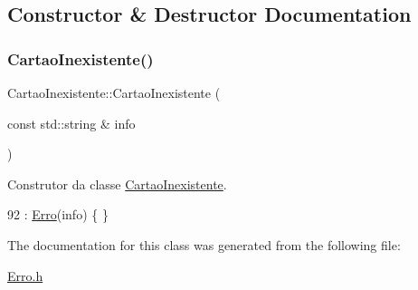 \subsection{Constructor \& Destructor Documentation}
\mbox{\label{classCartaoInexistente_a48a83d627aabc141aa1bb7216c74918b}} 
\subsubsection{\texorpdfstring{Cartao\+Inexistente()}{CartaoInexistente()}}
{\footnotesize\ttfamily Cartao\+Inexistente\+::\+Cartao\+Inexistente (\begin{DoxyParamCaption}\item[{const std\+::string \&}]{info }\end{DoxyParamCaption})\hspace{0.3cm}{\ttfamily [inline]}}



Construtor da classe \hyperlink{classCartaoInexistente}{Cartao\+Inexistente}. 


\begin{DoxyCode}
92 : \hyperlink{classErro_a15d79796bd17517ff05d45eee55556f1}{Erro}(info) \{ \}
\end{DoxyCode}


The documentation for this class was generated from the following file\+:\begin{DoxyCompactItemize}
\item 
\hyperlink{Erro_8h}{Erro.\+h}\end{DoxyCompactItemize}
